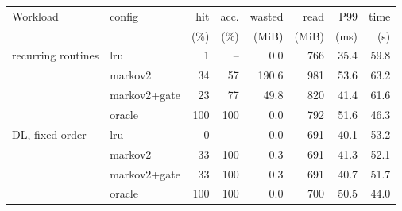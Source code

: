 \begin{tabular}{@{}llrrrrrr@{}}
\toprule
Workload & config & hit & acc. & wasted & read & P99 & time \\
 & & (\%) & (\%) & (MiB) & (MiB) & (ms) & (s) \\
\midrule
recurring routines & lru & 1 & -- & 0.0 & 766 & 35.4 & 59.8 \\
 & markov2 & 34 & 57 & 190.6 & 981 & 53.6 & 63.2 \\
 & markov2+gate & 23 & 77 & 49.8 & 820 & 41.4 & 61.6 \\
 & oracle & 100 & 100 & 0.0 & 792 & 51.6 & 46.3 \\
\midrule
DL, fixed order & lru & 0 & -- & 0.0 & 691 & 40.1 & 53.2 \\
 & markov2 & 33 & 100 & 0.3 & 691 & 41.3 & 52.1 \\
 & markov2+gate & 33 & 100 & 0.3 & 691 & 40.7 & 51.7 \\
 & oracle & 100 & 100 & 0.0 & 700 & 50.5 & 44.0 \\
\bottomrule
\end{tabular}
